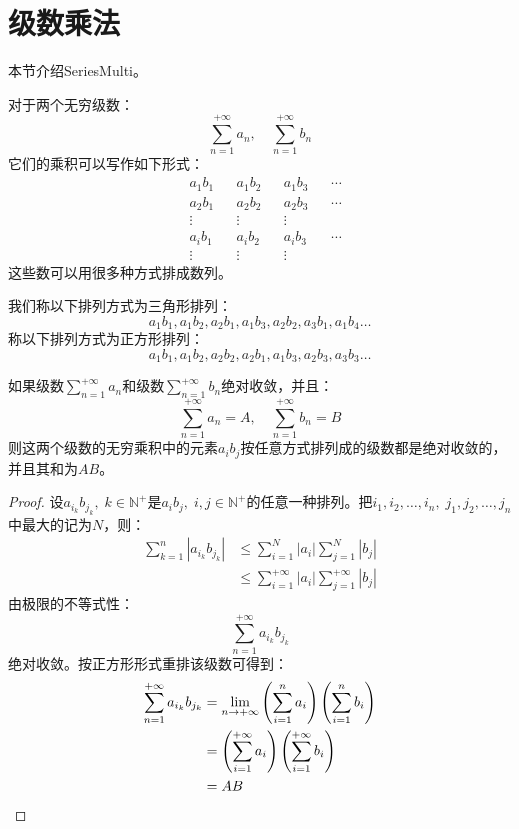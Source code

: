 \section{级数乘法}

本节介绍\gls{SeriesMulti}。\par
对于两个无穷级数：
\begin{equation*}
	\sum_{n=1}^{+\infty}a_n,\quad\sum_{n=1}^{+\infty}b_n
\end{equation*}
它们的乘积可以写作如下形式：
\begin{equation*}
	\begin{aligned}
		&a_1b_1	 &&a_1b_2	&&a_1b_3	&&\cdots\\
		&a_2b_1	 &&a_2b_2	&&a_2b_3	&&\cdots\\
		&\vdots	 &&\vdots	&&\vdots\\
		&a_ib_1	 &&a_ib_2	&&a_ib_3	&&\cdots\\
		&\vdots	 &&\vdots	&&\vdots
	\end{aligned}
\end{equation*}
这些数可以用很多种方式排成数列。\par
我们称以下排列方式为三角形排列：
\begin{equation*}
	a_1b_1,a_1b_2,a_2b_1,a_1b_3,a_2b_2,a_3b_1,a_1b_4\dots
\end{equation*}
称以下排列方式为正方形排列：
\begin{equation*}
	a_1b_1,a_1b_2,a_2b_2,a_2b_1,a_1b_3,a_2b_3,a_3b_3\dots
\end{equation*}
\begin{theorem}
	如果级数$\sum\limits_{n=1}^{+\infty}a_n$和级数$\sum\limits_{n=1}^{+\infty}b_n$绝对收敛，并且：
	\begin{equation*}
		\sum_{n=1}^{+\infty}a_n=A,\quad\sum_{n=1}^{+\infty}b_n=B
	\end{equation*}
	则这两个级数的无穷乘积中的元素$a_ib_j$按任意方式排列成的级数都是绝对收敛的，并且其和为$AB$。
\end{theorem}
\begin{proof}
	设$a_{i_k}b_{j_k},\;k\in\mathbb{N}^+$是$a_ib_j,\;i,j\in\mathbb{N}^+$的任意一种排列。把$i_1,i_2,\dots,i_n,\;j_1,j_2,\dots,j_n$中最大的记为$N$，则：
	\begin{align*}
		\sum_{k=1}^n|a_{i_k}b_{j_k}|
		&\leqslant\sum_{i=1}^N|a_i|\sum_{j=1}^N|b_j| \\
		&\leqslant\sum_{i=1}^{+\infty}|a_i|\sum_{j=1}^{+\infty}|b_j|
	\end{align*}
	由极限的不等式性：
	\begin{equation*}
		\sum_{n=1}^{+\infty}a_{i_k}b_{j_k}
	\end{equation*}
	绝对收敛。按正方形形式重排该级数可得到：
	\begin{align*}
		\sum_{n=1}^{+\infty}a_{i_k}b_{j_k}
		&=\lim_{n\to+\infty}\left(\sum_{i=1}^na_i\right)\left(\sum_{i=1}^nb_i\right) \\
		&=\left(\sum_{i=1}^{+\infty}a_i\right)\left(\sum_{i=1}^{+\infty}b_i\right) \\
		&=AB\qedhere
	\end{align*}
\end{proof}
